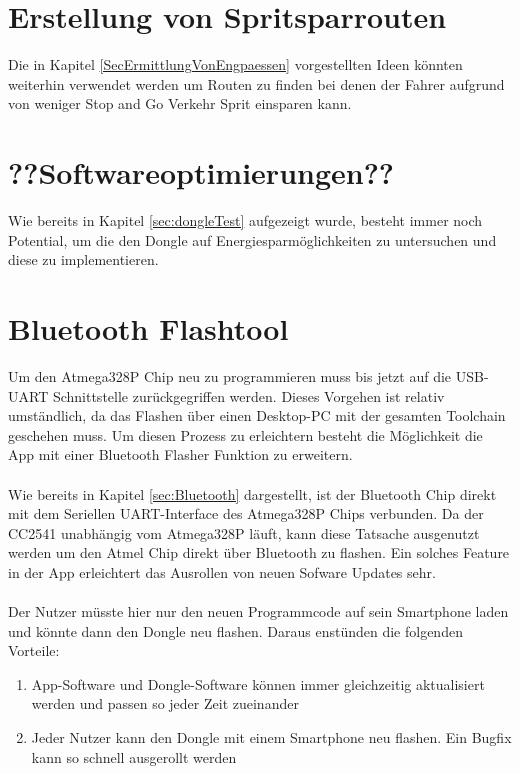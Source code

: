 \section{Erstellung von Spritsparrouten}
Die in Kapitel \ref{SecErmittlungVonEngpaessen} vorgestellten Ideen könnten weiterhin verwendet werden um Routen zu finden bei denen der Fahrer aufgrund von weniger Stop and Go Verkehr Sprit einsparen kann.

\section{??Softwareoptimierungen??}
Wie bereits in Kapitel \ref{sec:dongleTest} aufgezeigt wurde, besteht immer noch Potential, um die den Dongle auf Energiesparmöglichkeiten zu untersuchen und diese zu implementieren.

\section{Bluetooth Flashtool}
Um den Atmega328P Chip neu zu programmieren muss bis jetzt auf die USB-UART Schnittstelle zurückgegriffen werden. Dieses Vorgehen ist relativ umständlich, da das Flashen über einen Desktop-PC mit der gesamten Toolchain geschehen muss. Um diesen Prozess zu erleichtern besteht die Möglichkeit die App mit einer Bluetooth Flasher Funktion zu erweitern.
\paragraph{}
Wie bereits in Kapitel \ref{sec:Bluetooth} dargestellt, ist der Bluetooth Chip direkt mit dem Seriellen UART-Interface des Atmega328P Chips verbunden. Da der CC2541 unabhängig vom Atmega328P läuft, kann diese Tatsache ausgenutzt werden um den Atmel Chip direkt über Bluetooth zu flashen. Ein solches Feature in der App erleichtert das Ausrollen von neuen Sofware Updates sehr.
\paragraph{}
Der Nutzer müsste hier nur den neuen Programmcode auf sein Smartphone laden und könnte dann den Dongle neu flashen. 
Daraus enstünden die folgenden Vorteile: 
\begin{enumerate}
	\item App-Software und Dongle-Software können immer gleichzeitig aktualisiert werden und passen so jeder Zeit zueinander
	\item Jeder Nutzer kann den Dongle mit einem Smartphone neu flashen. Ein Bugfix kann so schnell ausgerollt werden 
\end{enumerate}